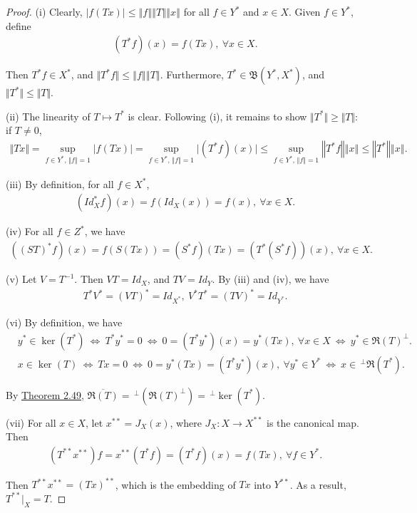 \documentclass{article}
\begin{document}
\begin{proof}
(i) Clearly, $\vert f(Tx)\vert \leq\left\Vert f\right\Vert\left\Vert T\right\Vert\left\Vert x\right\Vert$ for all $f\in Y^*$ and $x\in X$. Given $f\in Y^*$, define
\begin{align*}
	(T^*f)(x) = f(Tx),\ \forall x\in X.
\end{align*}

Then $T^*f\in X^*$, and $\Vert T^* f\Vert\leq\left\Vert f\right\Vert\left\Vert T\right\Vert$. Furthermore, $T^*\in\mathfrak{B}(Y^*,X^*)$, and $\Vert T^*\Vert\leq \Vert T\Vert$.\vspace{0.1cm}

(ii) The linearity of $T\mapsto T^*$ is clear. Following (i), it remains to show $\Vert T^*\Vert\geq\Vert T\Vert$: if $T\neq 0$,
\begin{align*}
	\Vert Tx\Vert = \sup_{f\in Y^*,\,\Vert f\Vert=1} \vert f(Tx)\vert = \sup_{f\in Y^*,\,\Vert f\Vert=1} \vert (T^*f)(x)\vert\leq\sup_{f\in Y^*,\,\Vert f\Vert=1}\left\Vert T^*f\right\Vert\left\Vert x\right\Vert \leq \left\Vert T^*\right\Vert\left\Vert x\right\Vert.
\end{align*}

(iii) By definition, for all $f\in X^*$,
\begin{align*}
	(Id_X^* f)(x) = f(Id_X(x)) = f(x),\ \forall x\in X.
\end{align*}

(iv) For all $f\in Z^*$, we have
\begin{align*}
	\left((S T)^*f\right)(x) = f\left(S(Tx)\right) = (S^*f)(Tx) = (T^*(S^*f))(x),\ \forall x\in X.
\end{align*}

(v) Let $V=T^{-1}$. Then $VT=Id_X$, and $TV=Id_Y$. By (iii) and (iv), we have
\begin{align*}
	T^*V^* = (VT)^* = Id_{X^*},\ V^*T^* = (TV)^* = Id_{Y^*}.
\end{align*}

(vi) By definition, we have
\begin{align*}
	&y^*\in\ker(T^*)\ \Leftrightarrow\ T^*y^* = 0\ \Leftrightarrow\ 0=(T^*y^*)(x) = y^*(Tx),\ \forall x\in X\ \Leftrightarrow\ y^*\in\mathfrak{R}(T)^\perp.\\
	&x\in\ker(T)\ \Leftrightarrow\ Tx = 0\ \Leftrightarrow\ 0=y^*(Tx) = (T^*y^*)(x),\ \forall y^*\in Y^*\ \Leftrightarrow\ x\in\, ^\perp\mathfrak{R}(T^*).
\end{align*}

By \hyperref[thm:2.49]{Theorem 2.49}, $\overline{\mathfrak{R}(T)} =\, ^\perp(\mathfrak{R}(T)^\perp) =\, ^\perp\ker(T^*)$.
\vspace{0.1cm}

(vii) For all $x\in X$, let $x^{**}=J_X(x)$, where $J_X:X\to X^{**}$ is the canonical map. Then
\begin{align*}
	(T^{**}x^{**})f = x^{**}(T^* f) = (T^* f)(x) = f(Tx),\ \forall f\in Y^*.
\end{align*}

Then $T^{**}x^{**} = (Tx)^{**}$, which is the embedding of $Tx$ into $Y^{**}$. As a result, $T^{**}|_X = T$.
\end{proof}
\end{document}

